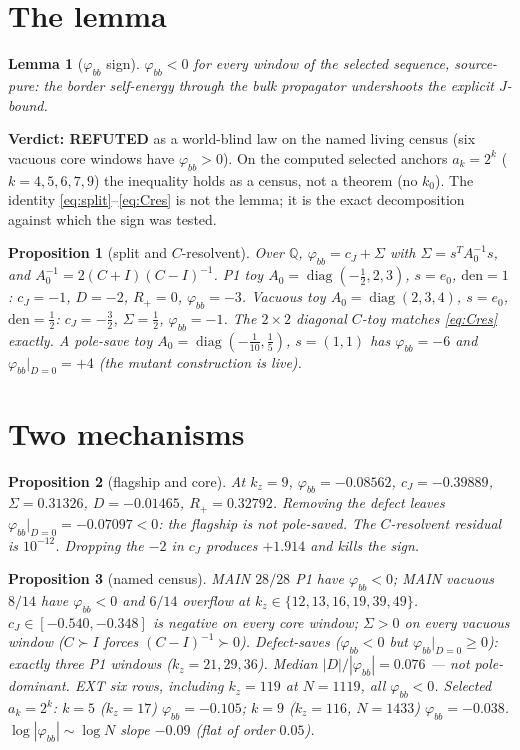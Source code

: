 \documentclass[11pt]{article}
\newtheorem{lemma}{Lemma}
\newtheorem{prop}{Proposition}
\theoremstyle{remark}
\newcommand{\phibb}{\varphi_{bb}}
\begin{document}
\section{The lemma}\label{sec:lem}

\begin{lemma}[$\varphi_{bb}$ sign]\label{lem:phibb}
$\phibb<0$ for every window of the selected sequence,
source-pure: the border self-energy through the bulk
propagator undershoots the explicit $J$-bound.
\end{lemma}

\noindent
\textbf{Verdict: REFUTED} as a world-blind law on the
named living census (six vacuous core windows have
$\phibb>0$).  On the computed selected anchors
$a_k=2^k$ ($k=4,5,6,7,9$) the inequality holds as a
census, not a theorem (no $k_{0}$).
The identity \eqref{eq:split}--\eqref{eq:Cres} is not
the lemma; it is the exact decomposition against which
the sign was tested.

\begin{prop}[split and $C$-resolvent]\label{prop:split}
Over $\mathbb{Q}$,
$\phibb=c_J+\Sigma$ with $\Sigma=s^{T}A_{0}^{-1}s$,
and $A_{0}^{-1}=2(C+I)(C-I)^{-1}$.
P1 toy $A_{0}=\operatorname{diag}(-\tfrac12,2,3)$,
$s=e_{0}$, $\mathrm{den}=1$:
$c_J=-1$, $D=-2$, $R_{+}=0$, $\phibb=-3$.
Vacuous toy $A_{0}=\operatorname{diag}(2,3,4)$,
$s=e_{0}$, $\mathrm{den}=\tfrac12$:
$c_J=-\tfrac32$, $\Sigma=\tfrac12$, $\phibb=-1$.
The $2\times 2$ diagonal $C$-toy matches
\eqref{eq:Cres} exactly.
A pole-save toy $A_{0}=\operatorname{diag}(-\tfrac1{10},\tfrac15)$,
$s=(1,1)$ has $\phibb=-6$ and $\phibb|_{D=0}=+4$
(the mutant construction is live).
\end{prop}

\section{Two mechanisms}\label{sec:mech}

\begin{prop}[flagship and core]\label{prop:w9}
At $k_z=9$,
$\phibb=-0.08562$,
$c_J=-0.39889$,
$\Sigma=0.31326$,
$D=-0.01465$,
$R_{+}=0.32792$.
Removing the defect leaves $\phibb|_{D=0}=-0.07097<0$:
the flagship is \emph{not} pole-saved.
The $C$-resolvent residual is $10^{-12}$.
Dropping the $-2$ in $c_J$ produces $+1.914$ and kills
the sign.
\end{prop}

\begin{prop}[named census]\label{prop:census}
MAIN $28/28$ P1 have $\phibb<0$; MAIN vacuous $8/14$
have $\phibb<0$ and $6/14$ overflow at
$k_z\in\{12,13,16,19,39,49\}$.
$c_J\in[-0.540,-0.348]$ is negative on every core window;
$\Sigma>0$ on every vacuous window
($C\succ I$ forces $(C-I)^{-1}\succ 0$).
Defect-saves ($\phibb<0$ but $\phibb|_{D=0}\ge 0$):
exactly three P1 windows ($k_z=21,29,36$).
Median $|D|/|\phibb|=0.076$ --- not pole-dominant.
EXT six rows, including $k_z=119$ at $N=1119$, all
$\phibb<0$.  Selected $a_k=2^k$:
$k=5$ ($k_z=17$) $\phibb=-0.105$;
$k=9$ ($k_z=116$, $N=1433$) $\phibb=-0.038$.
$\log|\phibb|\sim\log N$ slope $-0.09$ (flat of order $0.05$).
\end{prop}
\end{document}
